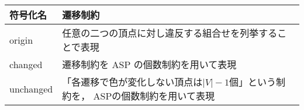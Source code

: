 \begin{tabular}{l|p{8cm}}
  符号化名 & 遷移制約 \\\hline
  origin & 任意の二つの頂点に対し違反する組合せを列挙することで表現  \\ \hline
  changed & 遷移制約を ASP の個数制約を用いて表現\\\hline
  unchanged & 「各遷移で色が変化しない頂点は$|V|-1$個」という制約を，
         ASPの個数制約を用いて表現
\end{tabular}